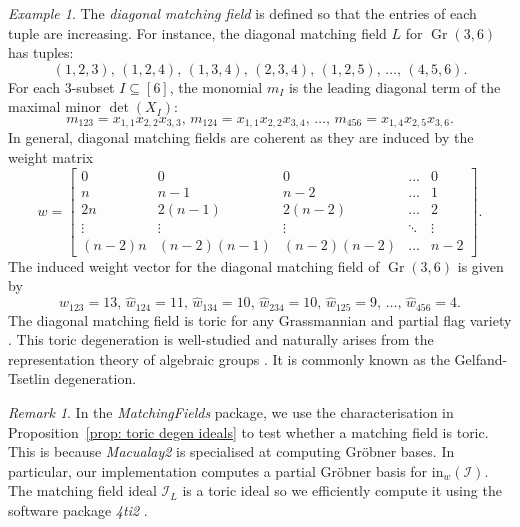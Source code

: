 \documentclass[11pt]{article}
\newcommand{\MI}{\mathcal I}
\newcommand{\init}{\text{in}}
\DeclareMathOperator{\Gr}{Gr}
\theoremstyle{plain}
\theoremstyle{definition}
\theoremstyle{remark}
\newtheorem{remark}[theorem]{Remark}
\newtheorem{example}[theorem]{Example}
\begin{document}
\begin{example}\label{example: bg diag mf}
    The \textit{diagonal matching field} is defined so that the entries of each tuple are increasing. For instance, the diagonal matching field $L$ for $\Gr(3,6)$ has tuples: 
    \[
    (1,2,3), \, 
    (1,2,4), \,
    (1,3,4), \,
    (2,3,4), \,
    (1,2,5), \, \dots, \, (4,5,6).
    \]
    For each $3$-subset $I \subseteq [6]$, the monomial $m_I$ is the leading diagonal term of the maximal minor $\det(X_I)$:
    \[
    m_{123} = x_{1,1}x_{2,2}x_{3,3},\, 
    m_{124} = x_{1,1}x_{2,2}x_{3,4},\,
    \dots,\,
    m_{456} = x_{1,4}x_{2,5}x_{3,6}.
    \]
    In general, diagonal matching fields are coherent as they are induced by the weight matrix
    \[
    w = \begin{bmatrix}
        0 & 0 & 0 & \dots & 0 \\
        n & n-1 & n-2 & \dots & 1 \\
        2n & 2(n-1) & 2(n-2) & \dots & 2 \\
        \vdots & \vdots & \vdots & \ddots & \vdots \\
        (n-2)n & (n-2)(n-1) & (n-2)(n-2) & \dots & n-2 
    \end{bmatrix}.
    \]
    The induced weight vector for the diagonal matching field of $\Gr(3,6)$ is given by
    \[
    \widehat w_{123} = 13, \, 
    \widehat w_{124} = 11, \,
    \widehat w_{134} = 10, \, 
    \widehat w_{234} = 10, \,
    \widehat w_{125} = 9, \,
    \dots, \,
    \widehat w_{456} = 4.
    \]
    The diagonal matching field is toric for any Grassmannian and partial flag variety \cite{miller2005combinatorial}. This toric degeneration is well-studied and naturally arises from the representation theory of algebraic groups \cite{gonciulea1996degenerations, makhlin2020gelfand}. It is commonly known as the Gelfand-Tsetlin degeneration.
\end{example}

\begin{remark}
    In the \textit{MatchingFields} package, we use the characterisation in Proposition~\ref{prop: toric degen ideals} to test whether a matching field is toric. This is because \textit{Macualay2} is specialised at computing Gr\"obner bases. In particular, our implementation computes a partial Gr\"obner basis for $\init_w(\MI)$. The matching field ideal $\MI_L$ is a toric ideal so we efficiently compute it using the software package \textit{4ti2} \cite{4ti2, FourTiTwoSource}.
\end{remark}
\end{document}

